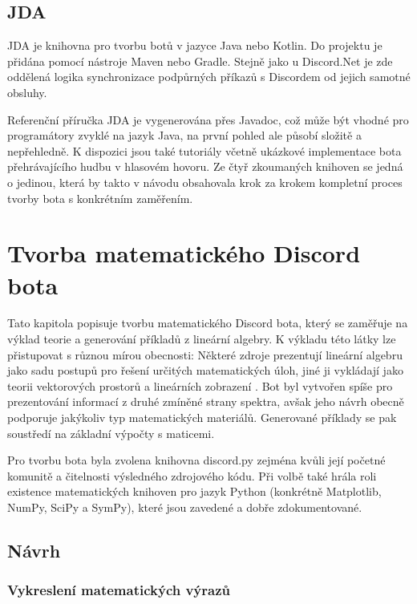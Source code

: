 \documentclass[FM]{tulthesis}
\begin{document}
	\section{JDA}
	
	JDA je knihovna pro tvorbu botů v jazyce Java nebo Kotlin. Do projektu je přidána pomocí nástroje Maven nebo Gradle. Stejně jako u Discord.Net je zde oddělená logika synchronizace podpůrných příkazů s Discordem od jejich samotné obsluhy.
	
	Referenční příručka JDA je vygenerována přes Javadoc, což může být vhodné pro programátory zvyklé na jazyk Java, na první pohled ale působí složitě a nepřehledně. K dispozici jsou také tutoriály včetně ukázkové implementace bota přehrávajícího hudbu v hlasovém hovoru. Ze čtyř zkoumaných knihoven se jedná o jedinou, která by takto v návodu obsahovala krok za krokem kompletní proces tvorby bota s konkrétním zaměřením.
	
	\chapter{Tvorba matematického Discord bota}
	
	Tato kapitola popisuje tvorbu matematického Discord bota, který se zaměřuje na výklad teorie a generování příkladů z lineární algebry. K výkladu této látky lze přistupovat s různou mírou obecnosti: Některé zdroje prezentují lineární algebru jako sadu postupů pro řešení určitých matematických úloh, jiné ji vykládají jako teorii vektorových prostorů a lineárních zobrazení \cite{lit_lingebra}. Bot byl vytvořen spíše pro prezentování informací z druhé zmíněné strany spektra, avšak jeho návrh obecně podporuje jakýkoliv typ matematických materiálů. Generované příklady se pak soustředí na základní výpočty s maticemi.
	
	Pro tvorbu bota byla zvolena knihovna discord.py zejména kvůli její početné komunitě a čitelnosti výsledného zdrojového kódu. Při volbě také hrála roli existence matematických knihoven pro jazyk Python (konkrétně Matplotlib, NumPy, SciPy a SymPy), které jsou zavedené a dobře zdokumentované.
		
	\section{Návrh}
	
	\subsection{Vykreslení matematických výrazů}
	
\end{document}
